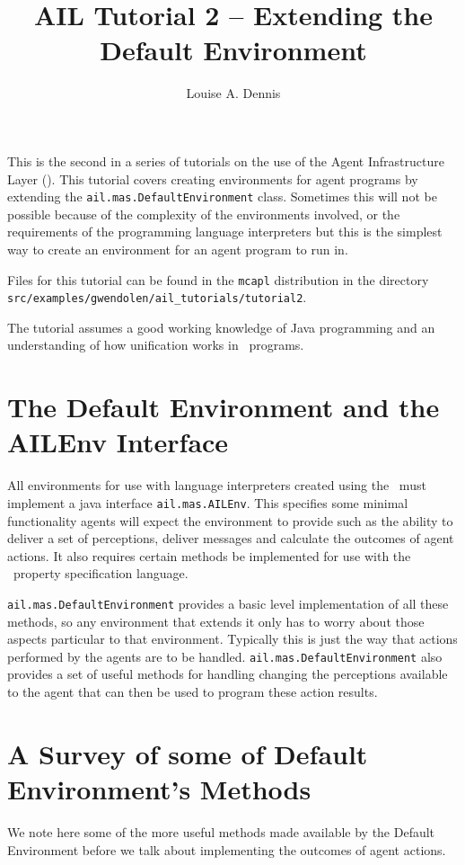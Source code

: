 \documentclass[a4]{article}
\author{Louise A. Dennis}
\title{AIL Tutorial 2 -- Extending the Default Environment}
\begin{document}
\maketitle
This is the second in a series of tutorials on the use of the Agent Infrastructure Layer (\ail).  This tutorial covers creating environments for agent programs by extending the \texttt{ail.mas.DefaultEnvironment} class.  Sometimes this will not be possible because of the complexity of the environments involved, or the requirements of the programming language interpreters but this is the simplest way to create an environment for an agent program to run in.

Files for this tutorial can be found in the \texttt{mcapl} distribution in the directory \texttt{src/examples/gwendolen/ail\_tutorials/tutorial2}.

The tutorial assumes a good working knowledge of Java programming and an understanding of how unification works in \prolog\ programs.

\section{The Default Environment and the AILEnv Interface}
All environments for use with language interpreters created using the \ail\ must implement a java interface \texttt{ail.mas.AILEnv}.  This specifies some minimal functionality agents will expect the environment to provide such as the ability to deliver a set of perceptions, deliver messages and calculate the outcomes of agent actions.  It also requires certain methods be implemented for use with the \ajpf\ property specification language.

\texttt{ail.mas.DefaultEnvironment} provides a basic level implementation of all these methods, so any environment that extends it only has to worry about those aspects particular to that environment.  Typically this is just the way that actions performed by the agents are to be handled.  \texttt{ail.mas.DefaultEnvironment} also provides a set of useful methods for handling changing the perceptions available to the agent that can then be used to program these action results.

\section{A Survey of some of Default Environment's Methods}
We note here some of the more useful methods made available by the Default Environment before we talk about implementing the outcomes of agent actions.
\end{document}
